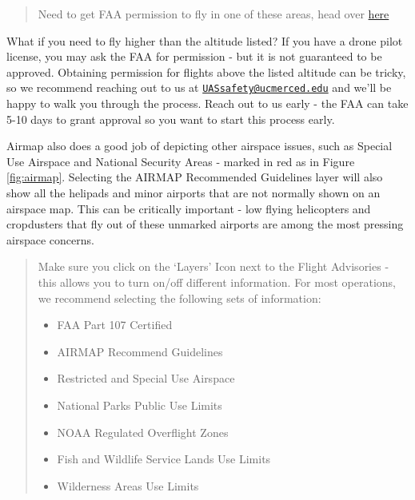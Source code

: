 \documentclass[
]{book}
\providecommand{\tightlist}{%
  \setlength{\itemsep}{0pt}\setlength{\parskip}{0pt}}
\begin{document}
\begin{quote}
Need to get FAA permission to fly in one of these areas, head over \protect\hyperlink{ch-LAANC}{here}
\end{quote}

What if you need to fly higher than the altitude listed? If you have a drone pilot license, you may ask the FAA for permission - but it is not guaranteed to be approved. Obtaining permission for flights above the listed altitude can be tricky, so we recommend reaching out to us at \href{mailto:UASsafety@ucmerced.edu}{\nolinkurl{UASsafety@ucmerced.edu}} and we'll be happy to walk you through the process. Reach out to us early - the FAA can take 5-10 days to grant approval so you want to start this process early.

Airmap also does a good job of depicting other airspace issues, such as Special Use Airspace and National Security Areas - marked in red as in Figure \ref{fig:airmap}. Selecting the AIRMAP Recommended Guidelines layer will also show all the helipads and minor airports that are not normally shown on an airspace map. This can be critically important - low flying helicopters and cropdusters that fly out of these unmarked airports are among the most pressing airspace concerns.

\begin{quote}
Make sure you click on the `Layers' Icon next to the Flight Advisories - this allows you to turn on/off different information. For most operations, we recommend selecting the following sets of information:

\begin{itemize}
\tightlist
\item
  FAA Part 107 Certified
\item
  AIRMAP Recommend Guidelines
\item
  Restricted and Special Use Airspace
\item
  National Parks Public Use Limits
\item
  NOAA Regulated Overflight Zones
\item
  Fish and Wildlife Service Lands Use Limits
\item
  Wilderness Areas Use Limits
\end{itemize}
\end{quote}
\end{document}
